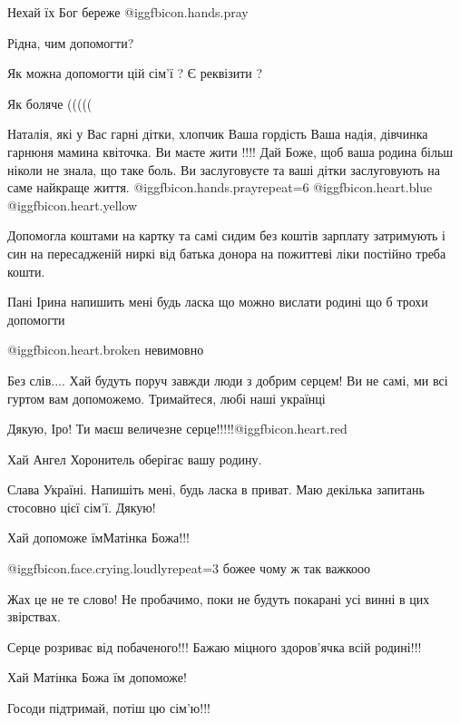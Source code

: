 \begin{itemize}
Нехай їх Бог береже  @igg{fbicon.hands.pray} 

Рідна, чим допомогти?

Як можна допомогти цій сім’ї ? Є реквізити ?

Як боляче (((((


Наталія, які у Вас гарні дітки, хлопчик Ваша гордість Ваша надія, дівчинка
гарнюня мамина квіточка. Ви маєте жити !!!! Дай Боже, щоб ваша родина більш
ніколи не знала, що таке боль. Ви заслуговуєте та ваші дітки заслуговують на
саме найкраще життя. @igg{fbicon.hands.pray}{repeat=6}  @igg{fbicon.heart.blue}  @igg{fbicon.heart.yellow} 


Допомогла коштами на картку та самі сидим без коштів зарплату затримують і син
на пересадженій ниркі від батька донора на пожиттеві ліки постійно треба кошти.

Пані Ірина напишить мені будь ласка що можно вислати родині що б трохи допомогти

 @igg{fbicon.heart.broken} невимовно


Без слів.... Хай будуть поруч завжди люди з добрим серцем! Ви не самі, ми всі
гуртом вам допоможемо. Тримайтеся, любі наші українці

Дякую, Іро! Ти маєш величезне серце!!!!!@igg{fbicon.heart.red}

Хай Ангел Хоронитель оберігає вашу родину.

Слава Україні. Напишіть мені, будь ласка в приват. Маю декілька запитань
стосовно цієї сім'ї. Дякую!

Хай допоможе їмМатінка Божа!!!

 @igg{fbicon.face.crying.loudly}{repeat=3} божее чому ж так важкооо

Жах це не те слово! Не пробачимо, поки не будуть покарані усі винні в цих звірствах.

Серце розриває від побаченого!!! Бажаю міцного здоров'ячка всій родині!!!

Хай Матінка Божа їм допоможе!

Госоди підтримай, потіш цю сім'ю!!!


\end{itemize}

